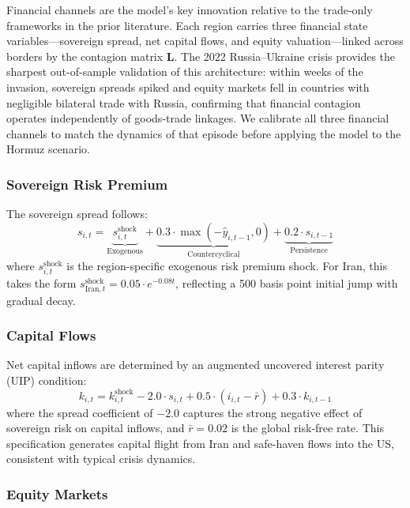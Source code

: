 \documentclass[12pt]{article}
\begin{document}
Financial channels are the model's key innovation relative to the trade-only frameworks in the prior literature. Each region carries three financial state variables---sovereign spread, net capital flows, and equity valuation---linked across borders by the contagion matrix $\mathbf{L}$. The 2022 Russia--Ukraine crisis provides the sharpest out-of-sample validation of this architecture: within weeks of the invasion, sovereign spreads spiked and equity markets fell in countries with negligible bilateral trade with Russia, confirming that financial contagion operates independently of goods-trade linkages. We calibrate all three financial channels to match the dynamics of that episode before applying the model to the Hormuz scenario.

\subsubsection{Sovereign Risk Premium}

The sovereign spread follows:
\begin{equation}
s_{i,t} = \underbrace{s^{\text{shock}}_{i,t}}_{\text{Exogenous}} + \underbrace{0.3 \cdot \max(-\hat{y}_{i,t-1}, 0)}_{\text{Countercyclical}} + \underbrace{0.2 \cdot s_{i,t-1}}_{\text{Persistence}}
\label{eq:spread}
\end{equation}
where $s^{\text{shock}}_{i,t}$ is the region-specific exogenous risk premium shock. For Iran, this takes the form $s^{\text{shock}}_{\text{Iran},t} = 0.05 \cdot e^{-0.08t}$, reflecting a 500 basis point initial jump with gradual decay.

\subsubsection{Capital Flows}

Net capital inflows are determined by an augmented uncovered interest parity (UIP) condition:
\begin{equation}
k_{i,t} = k^{\text{shock}}_{i,t} - 2.0 \cdot s_{i,t} + 0.5 \cdot (i_{i,t} - \bar{r}) + 0.3 \cdot k_{i,t-1}
\label{eq:capital}
\end{equation}
where the spread coefficient of $-2.0$ captures the strong negative effect of sovereign risk on capital inflows, and $\bar{r} = 0.02$ is the global risk-free rate. This specification generates capital flight from Iran and safe-haven flows into the US, consistent with typical crisis dynamics.

\subsubsection{Equity Markets}
\end{document}
